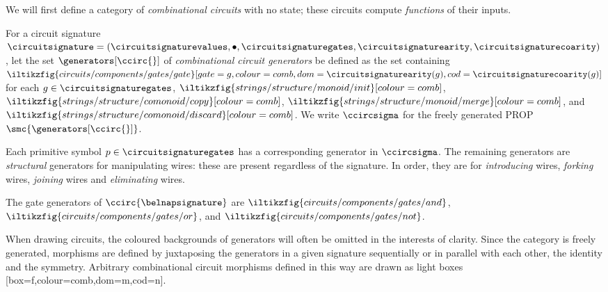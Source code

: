 \documentclass{lmcs}
\begin{document}
We will first define a category of \emph{combinational circuits} with no state;
these circuits compute \emph{functions} of their inputs.

\begin{defi}
    For a circuit signature \(
    \circuitsignature = (
    \circuitsignaturevalues,
    \bullet,
    \circuitsignaturegates,
    \circuitsignaturearity,
    \circuitsignaturecoarity
    )
    \), let the set \(\generators[\ccirc{}]\) of
    \emph{combinational circuit generators} be defined as the set containing \(
    \iltikzfig{circuits/components/gates/gate}[gate=g,colour=comb,dom=\circuitsignaturearity(g),cod=\circuitsignaturecoarity(g)]
    \) for each \(g \in \circuitsignaturegates\),
    \(\iltikzfig{strings/structure/monoid/init}[colour=comb]\),
    \(\iltikzfig{strings/structure/comonoid/copy}[colour=comb]\),
    \(\iltikzfig{strings/structure/monoid/merge}[colour=comb]\), and
    \(\iltikzfig{strings/structure/comonoid/discard}[colour=comb]\).
    We write \(\ccircsigma\) for the freely generated PROP
    \(\smc{\generators[\ccirc{}]}\).
\end{defi}

Each primitive symbol \(p \in \circuitsignaturegates\) has a corresponding
generator in \(\ccircsigma\).
The remaining generators are \emph{structural} generators
for manipulating
wires: these are present regardless of the signature.
In order, they are for \emph{introducing} wires, \emph{forking}
wires, \emph{joining} wires and \emph{eliminating} wires.

\begin{exa}
    The gate generators of \(\ccirc{\belnapsignature}\) are \(
    \iltikzfig{circuits/components/gates/and}
    \), \(
    \iltikzfig{circuits/components/gates/or}
    \), and \(
    \iltikzfig{circuits/components/gates/not}
    \).
\end{exa}

When drawing circuits, the coloured backgrounds of generators will often be
omitted in the interests of clarity.
Since the category is freely generated, morphisms are defined by
juxtaposing the generators in a given signature sequentially or in parallel with
each other, the identity and the symmetry.
Arbitrary combinational circuit morphisms defined in this way are drawn as light
boxes [box=f,colour=comb,dom=m,cod=n].
\end{document}
